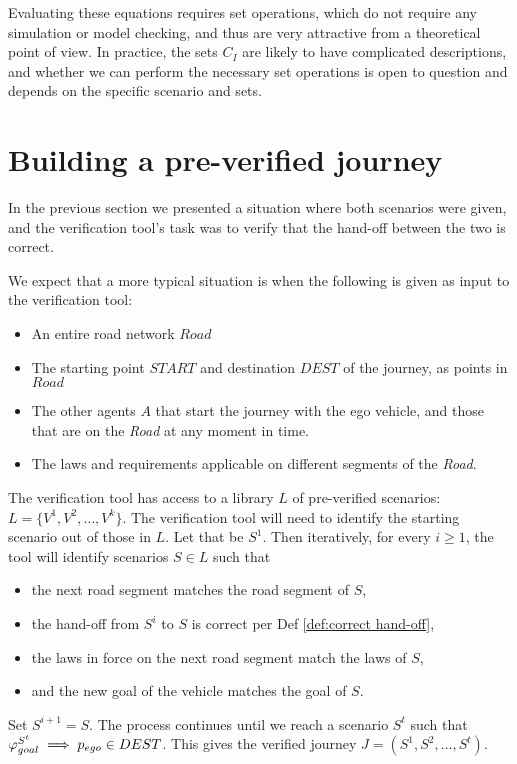 Evaluating these equations requires set operations, which do not require any simulation or model checking, and thus are very attractive from a theoretical point of view.
In practice, the sets $C_I$ are likely to have complicated descriptions, and whether we can perform the necessary set operations is open to question and depends on the specific scenario and sets.

\section{Building a pre-verified journey}
\label{sec:detecting hand-off}
In the previous section we presented a situation where both scenarios were given, and the verification tool's task was to verify that the hand-off between the two is correct.

We expect that a more typical situation is when the following is given as input to the verification tool:
\begin{itemize}
	\item An entire road network $Road$
	\item The starting point $START$ and destination $DEST$ of the journey, as points in $Road$
	\item The other agents $A$ that start the journey with the ego vehicle, and those that are on the \emph{Road} at any moment in time.
	\item The laws and requirements applicable on different segments of the \emph{Road}.
\end{itemize}

The verification tool has access to a library $L$ of pre-verified scenarios: 
$L = \{V^1,V^2,\ldots,V^k\}$.
The verification tool will need to identify the starting scenario out of those in $L$. 
Let that be $S^1$.
Then iteratively, for every $i \geq 1$, the tool will identify scenarios $S \in L$ such that 
\begin{itemize}
	\item the next road segment matches the road segment of $S$,
	\item the hand-off from $S^i$ to $S$ is correct per Def \ref{def:correct hand-off},
	\item the laws in force on the next road segment match the laws of $S$,
	\item and the new goal of the vehicle matches the goal of $S$.
\end{itemize}
Set $S^{i+1} = S$.
The process continues until we reach a scenario $S^t$ such that $\varphi_{goal}^{S^t} \implies p_{ego} \in DEST$.
This gives the verified journey $J = (S^1,S^2,\ldots,S^t)$.

